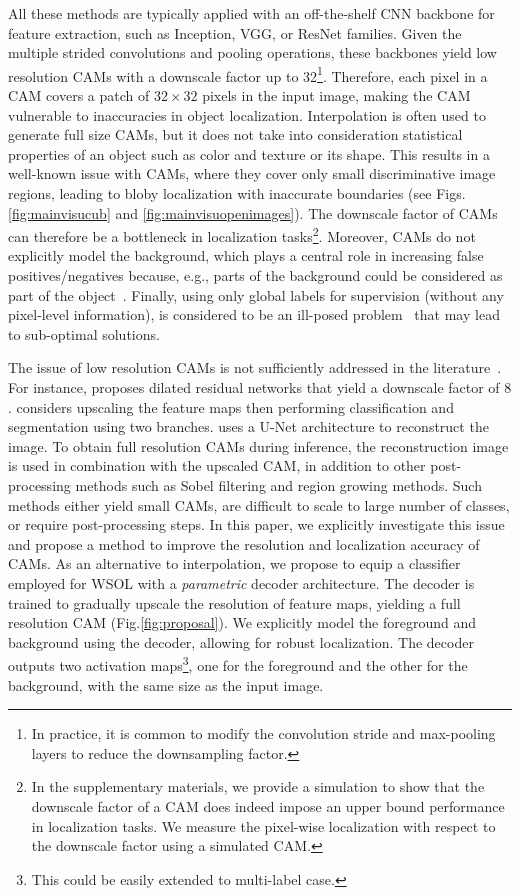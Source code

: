 \documentclass[twocolumn]{article}
\theoremstyle{definition}
\begin{document}
All these methods are typically applied with an off-the-shelf CNN backbone for feature extraction, such as Inception, VGG, or ResNet families. Given the multiple strided convolutions and pooling operations, these  backbones yield low resolution CAMs with a downscale factor up to 32\footnote{In practice, it is common to modify the convolution stride and max-pooling layers to reduce the downsampling factor.}.
Therefore, each pixel in a CAM covers a patch of ${32\times32}$ pixels in the input image, making the CAM vulnerable to inaccuracies in object localization. Interpolation is often used to generate full size CAMs, but it does not take into consideration statistical properties of an object such as color and texture or its shape. This results in a well-known issue with CAMs, where they cover only small discriminative image regions, leading to bloby localization with inaccurate boundaries (see Figs. \ref{fig:mainvisucub} and \ref{fig:mainvisuopenimages}).  The downscale factor of CAMs can therefore be a bottleneck in localization tasks\footnote{In the supplementary materials, we provide a simulation to show that the downscale factor of a CAM does indeed impose an upper bound performance in localization tasks. We measure the pixel-wise localization with respect to the downscale factor using a simulated CAM.}.
Moreover, CAMs do not explicitly model the background, which plays a central role in increasing false positives/negatives because, e.g., parts of the background could be considered as part of the object~\cite{rony2019weak-loc-histo-survey}.
Finally, using only global labels for supervision (without any pixel-level information), is considered to be an ill-posed problem~\cite{choe2020evaluating,WanWHJY19} that may lead to sub-optimal solutions.


The issue of low resolution CAMs is not sufficiently addressed in the literature~\cite{TagarisSS19,YuKF17,ZhangXWSH20RELI}. For instance, \cite{YuKF17} proposes dilated residual networks that yield a downscale factor of $8$. \cite{ZhangXWSH20RELI} considers upscaling the feature maps then performing classification and segmentation using two branches. \cite{TagarisSS19} uses a U-Net architecture to reconstruct the image. To obtain full resolution CAMs during inference, the reconstruction image is used in combination with the upscaled CAM, in addition to other post-processing methods such as Sobel filtering and region growing methods. Such methods either yield small CAMs, are difficult to scale to large number of classes, or require post-processing steps.
In this paper, we explicitly investigate this issue and propose a method to improve the resolution and localization accuracy of CAMs. As an alternative to interpolation, we propose to equip a classifier employed for WSOL with a \emph{parametric} decoder architecture. The decoder is trained to gradually upscale the resolution of feature maps, yielding a full resolution CAM (Fig.\ref{fig:proposal}). We explicitly model the foreground and background using the decoder, allowing for robust localization. The decoder outputs two activation maps\footnote{This could be easily extended to multi-label case.}, one for the foreground and the other for the background, with the same size as the input image.
\end{document}
